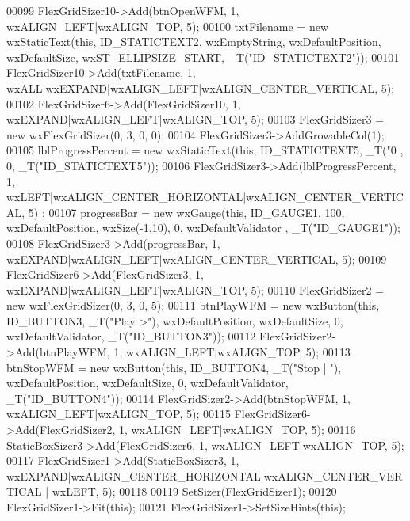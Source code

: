 \begin{DoxyCode}
00099     FlexGridSizer10->Add(btnOpenWFM, 1, wxALIGN\_LEFT|wxALIGN\_TOP, 5);
00100     txtFilename = \textcolor{keyword}{new} wxStaticText(\textcolor{keyword}{this}, ID\_STATICTEXT2, wxEmptyString, wxDefaultPosition, wxDefaultSize, 
      wxST\_ELLIPSIZE\_START, \_T(\textcolor{stringliteral}{"ID\_STATICTEXT2"}));
00101     FlexGridSizer10->Add(txtFilename, 1, wxALL|wxEXPAND|wxALIGN\_LEFT|wxALIGN\_CENTER\_VERTICAL, 5);
00102     FlexGridSizer6->Add(FlexGridSizer10, 1, wxEXPAND|wxALIGN\_LEFT|wxALIGN\_TOP, 5);
00103     FlexGridSizer3 = \textcolor{keyword}{new} wxFlexGridSizer(0, 3, 0, 0);
00104     FlexGridSizer3->AddGrowableCol(1);
00105     lblProgressPercent = \textcolor{keyword}{new} wxStaticText(\textcolor{keyword}{this}, ID\_STATICTEXT5, \_T(\textcolor{stringliteral}{"0 %
      , 0, \_T(\textcolor{stringliteral}{"ID\_STATICTEXT5"}));
00106     FlexGridSizer3->Add(lblProgressPercent, 1, wxLEFT|wxALIGN\_CENTER\_HORIZONTAL|wxALIGN\_CENTER\_VERTICAL, 5)
      ;
00107     progressBar = \textcolor{keyword}{new} wxGauge(\textcolor{keyword}{this}, ID\_GAUGE1, 100, wxDefaultPosition, wxSize(-1,10), 0, wxDefaultValidator
      , \_T(\textcolor{stringliteral}{"ID\_GAUGE1"}));
00108     FlexGridSizer3->Add(progressBar, 1, wxEXPAND|wxALIGN\_LEFT|wxALIGN\_CENTER\_VERTICAL, 5);
00109     FlexGridSizer6->Add(FlexGridSizer3, 1, wxEXPAND|wxALIGN\_LEFT|wxALIGN\_TOP, 5);
00110     FlexGridSizer2 = \textcolor{keyword}{new} wxFlexGridSizer(0, 3, 0, 5);
00111     btnPlayWFM = \textcolor{keyword}{new} wxButton(\textcolor{keyword}{this}, ID\_BUTTON3, \_T(\textcolor{stringliteral}{"Play >"}), wxDefaultPosition, wxDefaultSize, 0, 
      wxDefaultValidator, \_T(\textcolor{stringliteral}{"ID\_BUTTON3"}));
00112     FlexGridSizer2->Add(btnPlayWFM, 1, wxALIGN\_LEFT|wxALIGN\_TOP, 5);
00113     btnStopWFM = \textcolor{keyword}{new} wxButton(\textcolor{keyword}{this}, ID\_BUTTON4, \_T(\textcolor{stringliteral}{"Stop ||"}), wxDefaultPosition, wxDefaultSize, 0, 
      wxDefaultValidator, \_T(\textcolor{stringliteral}{"ID\_BUTTON4"}));
00114     FlexGridSizer2->Add(btnStopWFM, 1, wxALIGN\_LEFT|wxALIGN\_TOP, 5);
00115     FlexGridSizer6->Add(FlexGridSizer2, 1, wxALIGN\_LEFT|wxALIGN\_TOP, 5);
00116     StaticBoxSizer3->Add(FlexGridSizer6, 1, wxALIGN\_LEFT|wxALIGN\_TOP, 5);
00117     FlexGridSizer1->Add(StaticBoxSizer3, 1, wxEXPAND|wxALIGN\_CENTER\_HORIZONTAL|wxALIGN\_CENTER\_VERTICAL | 
      wxLEFT, 5);
00118 
00119     SetSizer(FlexGridSizer1);
00120     FlexGridSizer1->Fit(\textcolor{keyword}{this});
00121     FlexGridSizer1->SetSizeHints(\textcolor{keyword}{this});
}
\end{DoxyCode}
